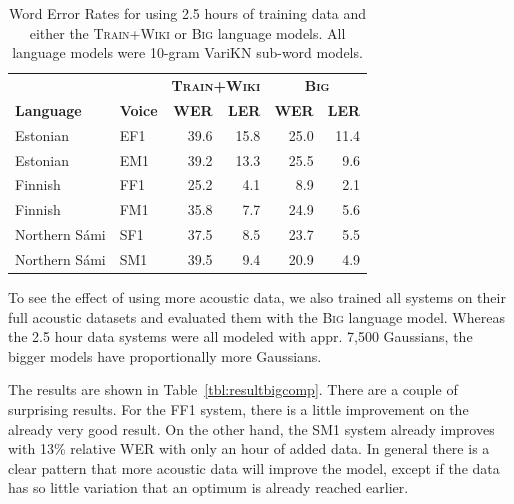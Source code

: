 \documentclass[b5paper]{article}
\newcommand{\ns}{Northern Sámi}
\newcommand{\ds}[1]{\textsc{#1}}
\begin{document}
\begin{table}
\centering
\begin{tabular}{ll|rr|rr}
 & & \multicolumn{2}{|c|}{\textbf{\ds{Train+Wiki}}}  & \multicolumn{2}{|c}{\textbf{\ds{Big}}}\\
\textbf{Language} & \textbf{Voice} & \textbf{WER} & \textbf{LER}& \textbf{{WER}} & \textbf{LER}\\\hline
Estonian & EF1 & 39.6 & 15.8 & 25.0 & 11.4\\
Estonian & EM1 & 39.2 & 13.3 & 25.5 & 9.6\\
Finnish & FF1 & 25.2 &4.1& 8.9 & 2.1  \\
Finnish & FM1 & 35.8 & 7.7 & 24.9 &  5.6 \\
\ns & SF1 & 37.5 & 8.5 & 23.7  & 5.5 \\
\ns & SM1 & 39.5 & 9.4& 20.9 & 4.9  \\
\end{tabular}
\caption{Word Error Rates for using 2.5 hours of training data and either the \ds{Train+Wiki} or \ds{Big} language models. All language models were 10-gram VariKN sub-word models.\label{tbl:resultssmallcomp}}
\end{table}

To see the effect of using more acoustic data, we also trained all systems on their full acoustic datasets and evaluated them with the \ds{Big} language model. Whereas the 2.5 hour data systems were all modeled with appr. 7,500 Gaussians, the bigger models have proportionally more Gaussians. 

The results are shown in Table~\ref{tbl:resultbigcomp}.  There are a couple of surprising results. For the FF1 system, there is a little improvement on the already very good result. On the other hand, the SM1 system already improves with 13\% relative WER with only an hour of added data. In general there is a clear pattern that more acoustic data will improve the model, except if the data has so little variation that an optimum is already reached earlier.
\end{document}
